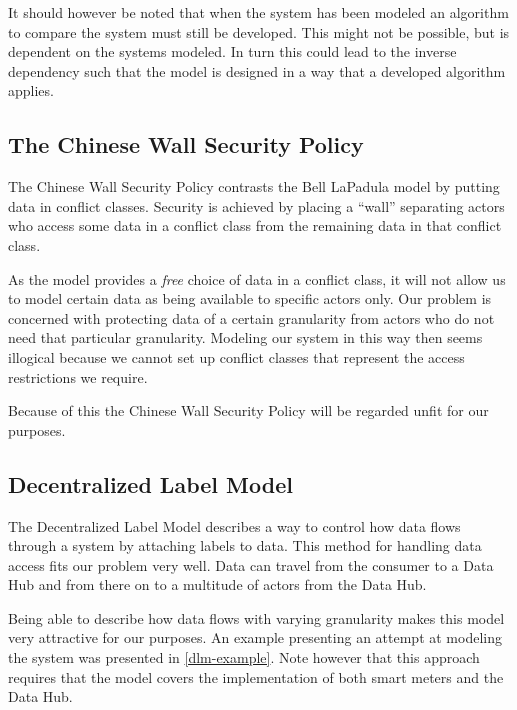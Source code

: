 It should however be noted that when the system has been modeled an algorithm to compare the system must still be developed.
This might not be possible, but is dependent on the systems modeled.
In turn this could lead to the inverse dependency such that the model is designed in a way that a developed algorithm applies.

\subsection{The Chinese Wall Security Policy}
The Chinese Wall Security Policy contrasts the Bell LaPadula model by putting data in conflict classes.
Security is achieved by placing a ``wall'' separating actors who access some data in a conflict class from the remaining data in that conflict class.

As the model provides a \emph{free} choice of data in a conflict class, it will not allow us to model certain data as being available to specific actors only.
Our problem is concerned with protecting data of a certain granularity from actors who do not need that particular granularity.
Modeling our system in this way then seems illogical because we cannot set up conflict classes that represent the access restrictions we require.

Because of this the Chinese Wall Security Policy will be regarded unfit for our purposes.

\subsection{Decentralized Label Model}
The Decentralized Label Model describes a way to control how data flows through a system by attaching labels to data.
This method for handling data access fits our problem very well.
Data can travel from the consumer to a Data Hub and from there on to a multitude of actors from the Data Hub.

Being able to describe how data flows with varying granularity makes this model very attractive for our purposes.
An example presenting an attempt at modeling the system was presented in \cref{dlm-example}.
Note however that this approach requires that the model covers the implementation of both smart meters and the Data Hub.